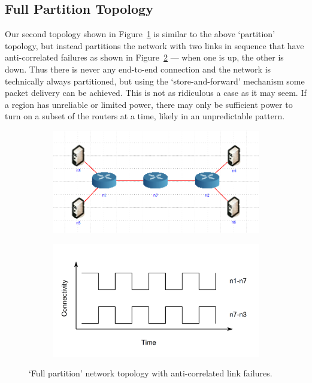 \documentclass[withindex,glossary,openany]{cam-thesis}
\begin{document}
\subsection{Full Partition Topology}

Our second topology shown in Figure~\ref{fig:full_partition_topology} is similar to the above `partition' topology, but instead partitions the network with two links in sequence that have anti-correlated failures as shown in Figure~\ref{fig:full_partition_graph} --- when one is up, the other is down. Thus there is never any end-to-end connection and the network is technically always partitioned, but using the `store-and-forward' mechanism some packet delivery can be achieved. This is not as ridiculous a case as it may seem. If a region has unreliable or limited power, there may only be sufficient power to turn on a subset of the routers at a time, likely in an unpredictable pattern.

\begin{figure}[H]
\centering
\begin{subfigure}{.5\textwidth}
  \centering
  \includegraphics[width=1\linewidth]{delay_full_partition_topology}
  \caption{}
  \label{fig:full_partition_topology}
\end{subfigure}%
\begin{subfigure}{.5\textwidth}
  \centering
  \includegraphics[width=1\linewidth]{delay_full_partition_graph}
  \caption{}
  \label{fig:full_partition_graph}
\end{subfigure}
\caption{`Full partition' network topology with anti-correlated link failures.}
\label{fig:full_partition}
\end{figure}
\end{document}
